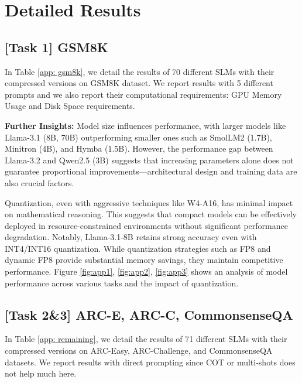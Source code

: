 \onecolumn
\newpage
{}

\renewcommand{\contentsname}{Contents of the Appendix}  
\newpage

\tableofcontents

\twocolumn

\section{Detailed Results}
\label{app: Detailed Results}

\subsection{[Task 1] GSM8K}
In Table \ref{app: gsm8k}, we detail the results of 70 different SLMs with their compressed versions on GSM8K dataset. We report results with 5 different prompts and we also report their computational requirements: GPU Memory Usage and Disk Space requirements. \medskip

\textbf{Further Insights:} Model size influences performance, with larger models like Llama-3.1 (8B, 70B) outperforming smaller ones such as SmolLM2 (1.7B), Minitron (4B), and Hymba (1.5B). However, the performance gap between Llama-3.2 and Qwen2.5 (3B) suggests that increasing parameters alone does not guarantee proportional improvements—architectural design and training data are also crucial factors.\medskip

Quantization, even with aggressive techniques like W4-A16, has minimal impact on mathematical reasoning. This suggests that compact models can be effectively deployed in resource-constrained environments without significant performance degradation. Notably, Llama-3.1-8B retains strong accuracy even with INT4/INT16 quantization. While quantization strategies such as FP8 and dynamic FP8 provide substantial memory savings, they maintain competitive performance. Figure \ref{fig:app1}, \ref{fig:app2}, \ref{fig:app3} shows an analysis of model performance across various tasks and the impact of quantization.


\subsection{[Task 2\&3] ARC-E, ARC-C, CommonsenseQA}
In Table \ref{app: remaining}, we detail the results of 71 different SLMs with their compressed versions on ARC-Easy, ARC-Challenge, and CommonsenseQA datasets. We report results with direct prompting since COT or multi-shots does not help much here. \medskip

